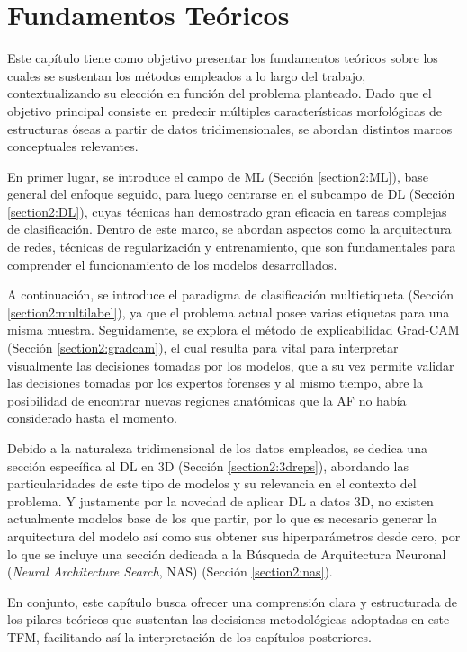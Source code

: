 \chapter{Fundamentos Teóricos}
Este capítulo tiene como objetivo presentar los fundamentos teóricos sobre los cuales se sustentan los métodos empleados a lo largo del trabajo, contextualizando su elección en función del problema planteado. Dado que el objetivo principal consiste en predecir múltiples características morfológicas de estructuras óseas a partir de datos tridimensionales, se abordan distintos marcos conceptuales relevantes.

En primer lugar, se introduce el campo de ML (Sección \ref{section2:ML}), base general del enfoque seguido, para luego centrarse en el subcampo de DL (Sección \ref{section2:DL}), cuyas técnicas han demostrado gran eficacia en tareas complejas de clasificación. Dentro de este marco, se abordan aspectos como la arquitectura de redes, técnicas de regularización y entrenamiento, que son fundamentales para comprender el funcionamiento de los modelos desarrollados.

A continuación, se introduce el paradigma de clasificación multietiqueta (Sección \ref{section2:multilabel}), ya que el problema actual posee varias etiquetas para una misma muestra. Seguidamente, se explora el método de explicabilidad Grad-CAM (Sección \ref{section2:gradcam}), el cual resulta para vital para interpretar visualmente las decisiones tomadas por los modelos, que a su vez permite validar las decisiones tomadas por los expertos forenses y al mismo tiempo, abre la posibilidad de encontrar nuevas regiones anatómicas que la AF no había considerado hasta el momento.

Debido a la naturaleza tridimensional de los datos empleados, se dedica una sección específica al DL en 3D (Sección \ref{section2:3dreps}), abordando las particularidades de este tipo de modelos y su relevancia en el contexto del problema. Y justamente por la novedad de aplicar DL a datos 3D, no existen actualmente modelos base de los que partir, por lo que es necesario generar la arquitectura del modelo así como sus obtener sus hiperparámetros desde cero, por lo que se incluye una sección dedicada a la Búsqueda de Arquitectura Neuronal (\textit{Neural Architecture Search}, NAS) (Sección \ref{section2:nas}).

En conjunto, este capítulo busca ofrecer una comprensión clara y estructurada de los pilares teóricos que sustentan las decisiones metodológicas adoptadas en este TFM, facilitando así la interpretación de los capítulos posteriores.

